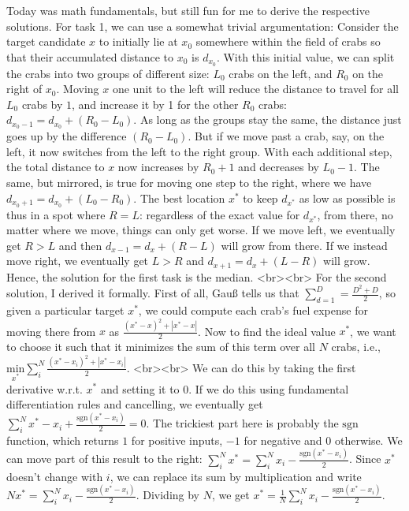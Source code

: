 Today was math fundamentals, but still fun for me to derive the respective solutions. For task 1, we can use a somewhat trivial argumentation: Consider the target candidate $x$ to initially lie at $x_0$ somewhere within the field of crabs so that their accumulated distance to $x_0$ is $d_{x_0}$. With this initial value, we can split the crabs into two groups of different size: $L_0$ crabs on the left, and $R_0$ on the right of $x_0$. Moving $x$ one unit to the left will reduce the distance to travel for all $L_0$ crabs by $1$, and increase it by 1 for the other $R_0$ crabs: $d_{x_{0}-1} = d_{x_0}+(R_0-L_0)$. As long as the groups stay the same, the distance just goes up by the difference $(R_0-L_0)$. But if we move past a crab, say, on the left, it now switches from the left to the right group. With each additional step, the total distance to $x$ now increases by $R_0+1$ and decreases by $L_0-1$. The same, but mirrored, is true for moving one step to the right, where we have $d_{x_{0}+1} = d_{x_0}+(L_0-R_0)$. The best location $x^\ast$ to keep $d_{x^\ast}$ as low as possible is thus in a spot where $R = L$: regardless of the exact value for $d_{x^\ast}$, from there, no matter where we move, things can only get worse. If we move left, we eventually get $R > L$ and then $d_{x - 1} = d_{x}+(R-L)$ will grow from there. If we instead move right, we eventually get $L > R$ and $d_{x+1} = d_{x}+(L-R)$ will grow. Hence, the solution for the first task is the median.
<br><br>
For the second solution, I derived it formally. First of all, Gauß tells us that $\sum_{d=1}^D = \frac{D^2 +D}{2}$, so given a particular target $x^\ast$, we could compute each crab's fuel expense for moving there from $x$ as $\frac{(x^\ast-x)^2 + |x^\ast-x|}{2}$. Now to find the ideal value $x^\ast$, we want to choose it such that it minimizes the sum of this term over all $N$ crabs, i.e., $\underset{x^\ast}{\text{min}} \sum_i^N \frac{(x^\ast-x_i)^2 + |x^\ast-x_i|}{2}$. 
<br><br>
We can do this by taking the first derivative w.r.t. $x^\ast$ and setting it to 0. If we do this using fundamental differentiation rules and cancelling, we eventually get $\sum_i^N x^\ast - x_i + \frac{\text{sgn}(x^\ast-x_i)}{2} = 0$. The trickiest part here is probably the $\text{sgn}$ function, which returns $1$ for positive inputs, $-1$ for negative and $0$ otherwise. We can move part of this result to the right: $\sum_i^N x^\ast = \sum_i^N x_i - \frac{\text{sgn}(x^\ast-x_i)}{2}$. Since $x^\ast$ doesn't change with $i$, we can replace its sum by multiplication and write $N x^\ast = \sum_i^N x_i - \frac{\text{sgn}(x^\ast-x_i)}{2}$. Dividing by $N$, we get $x^\ast = \frac{1}{N} \sum_i^N x_i - \frac{\text{sgn}(x^\ast-x_i)}{2}$. 
